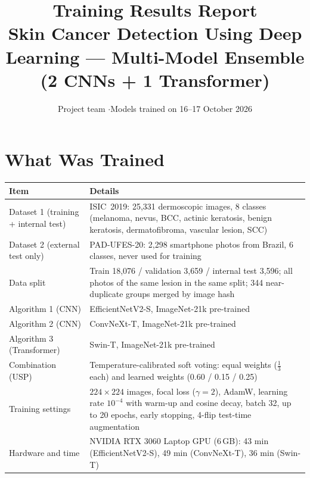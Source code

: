 \documentclass[10.5pt,a4paper]{article}
\title{\color{hcBlue}\bfseries Training Results Report\\[4pt]
\large Skin Cancer Detection Using Deep Learning ---
Multi-Model Ensemble (2 CNNs + 1 Transformer)}
\author{Project team \quad$\cdot$\quad Models trained on 16--17 October 2026}
\date{}
\begin{document}
\maketitle
\vspace{-6mm}


\section{What Was Trained}
\begin{tabularx}{\linewidth}{@{}L{3.6cm} Y@{}}
\toprule
\textbf{Item} & \textbf{Details} \\
\midrule
Dataset 1 (training + internal test) & ISIC~2019: 25{,}331 dermoscopic images, 8 classes (melanoma, nevus, BCC, actinic keratosis, benign keratosis, dermatofibroma, vascular lesion, SCC) \\
Dataset 2 (external test only) & PAD-UFES-20: 2{,}298 smartphone photos from Brazil, 6 classes, never used for training \\
Data split & Train 18{,}076 / validation 3{,}659 / internal test 3{,}596; all photos of the same lesion in the same split; 344 near-duplicate groups merged by image hash \\
Algorithm 1 (CNN) & EfficientNetV2-S, ImageNet-21k pre-trained \\
Algorithm 2 (CNN) & ConvNeXt-T, ImageNet-21k pre-trained \\
Algorithm 3 (Transformer) & Swin-T, ImageNet-21k pre-trained \\
Combination (USP) & Temperature-calibrated soft voting: equal weights ($\frac13$ each) and learned weights (0.60 / 0.15 / 0.25) \\
Training settings & $224\times224$ images, focal loss ($\gamma=2$), AdamW, learning rate $10^{-4}$ with warm-up and cosine decay, batch 32, up to 20 epochs, early stopping, 4-flip test-time augmentation \\
Hardware and time & NVIDIA RTX 3060 Laptop GPU (6\,GB): 43 min (EfficientNetV2-S), 49 min (ConvNeXt-T), 36 min (Swin-T) \\
\bottomrule
\end{tabularx}
\end{document}
